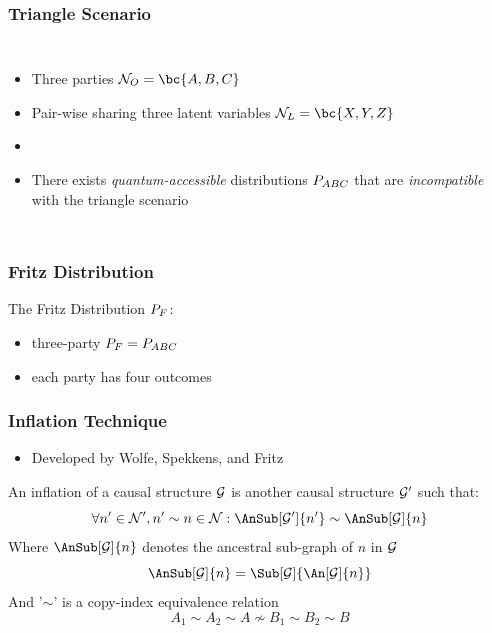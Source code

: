 \documentclass[
    hyperref={colorlinks=true, linkcolor=blue, urlcolor=blue, citecolor=MidnightBlue},
    xcolor={dvipsnames},
]{beamer}
\renewcommand{\term}[1]{\textcolor{Mahogany}{#1}}
\begin{document}
\begin{frame}
    \frametitle{Triangle Scenario}
    \begin{columns}
            \scalebox{1.0}{}
            \begin{itemize}
                \item Three parties $\nodes_O = \bc{A, B, C}$
                \item Pair-wise sharing three latent variables $\nodes_L = \bc{X, Y, Z}$
                \item {}
                \item There exists \textit{quantum-accessible} distributions $\prob[ABC]$ that are \textit{incompatible} with the triangle scenario
            \end{itemize}
    \end{columns}
\end{frame}

\begin{frame}
    \frametitle{Fritz Distribution}
    The \term{Fritz Distribution $\prob[F]$}:
    \begin{itemize}
        \item three-party $\prob[F] = \prob[ABC]$
        \item each party has four outcomes
    \end{itemize}
\end{frame}

\begin{frame}
    \frametitle{Inflation Technique}
    \begin{itemize}
        \item Developed by Wolfe, Spekkens, and Fritz \cite{Inflation}
    \end{itemize}
    \begin{definition}
        An \term{inflation} of a causal structure $\mathcal{G}$ is another causal structure $\mathcal{G}'$ such that:
        \[ \forall n' \in \nodes', n' \sim n \in \nodes: \AnSub[\graph']{n'} \sim \AnSub[\graph]{n} \]
        Where $\AnSub[\graph]{n}$ denotes the ancestral sub-graph of $n$ in $\mathcal{G}$
        \[ \AnSub[\graph]{n} = \Sub[\graph]{\An[\graph]{n}} \]
        And '$\sim$' is a \term{copy-index} equivalence relation
        \[ A_1 \sim A_2 \sim A \not \sim B_1 \sim B_2 \sim B \]
    \end{definition}

\end{frame}
\end{document}
